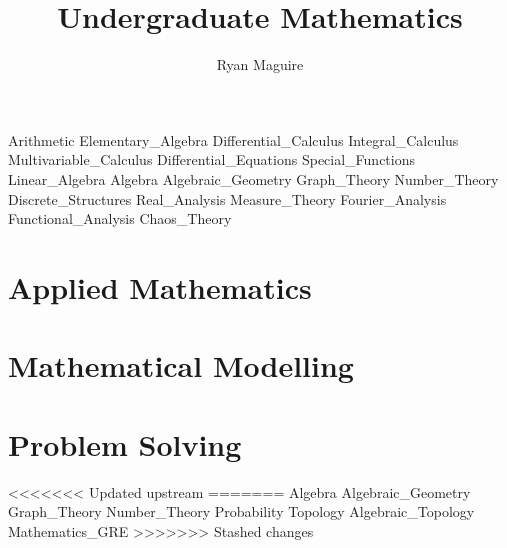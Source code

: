 \documentclass[crop=false,class=book,oneside]{standalone}
\begin{document}
    \newif\ifmathcourses
    \ifx\ifcourses\undefined
        \title{Undergraduate Mathematics}
        \author{Ryan Maguire}
        \date{\vspace{-5ex}}
        \maketitle
        \tableofcontents
        \listoffigures
        \listoftables
        \clearpage
    \fi
    {Arithmetic}
    {Elementary_Algebra}
    {Differential_Calculus}
    {Integral_Calculus}
    {Multivariable_Calculus}
    {Differential_Equations}
    {Special_Functions}
    {Linear_Algebra}
    {Algebra}
    {Algebraic_Geometry}
    {Graph_Theory}
    {Number_Theory}
    {Discrete_Structures}
    {Real_Analysis}
    {Measure_Theory}
    {Fourier_Analysis}
    {Functional_Analysis}
    {Chaos_Theory}
    \chapter{Applied Mathematics}
    \chapter{Mathematical Modelling}
    \chapter{Problem Solving}
<<<<<<< Updated upstream
=======
    {Algebra}
    {Algebraic_Geometry}
    {Graph_Theory}
    {Number_Theory}
    {Probability}
    {Topology}
    {Algebraic_Topology}
    {Mathematics_GRE}
>>>>>>> Stashed changes
\end{document}
